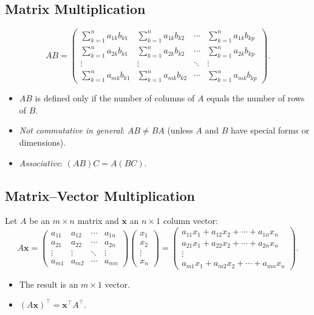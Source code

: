 \subsection{Matrix Multiplication}
\[
A B =
\begin{pmatrix}
\sum_{k=1}^n a_{1k} b_{k1} & \sum_{k=1}^n a_{1k} b_{k2} & \cdots & \sum_{k=1}^n a_{1k} b_{kp} \\
\sum_{k=1}^n a_{2k} b_{k1} & \sum_{k=1}^n a_{2k} b_{k2} & \cdots & \sum_{k=1}^n a_{2k} b_{kp} \\
\vdots                   & \vdots                   & \ddots & \vdots                   \\
\sum_{k=1}^n a_{mk} b_{k1} & \sum_{k=1}^n a_{mk} b_{k2} & \cdots & \sum_{k=1}^n a_{mk} b_{kp}
\end{pmatrix}.
\]
\begin{itemize}
\item $AB$ is defined only if the number of columns of $A$ equals the number of rows of $B$.
\item \emph{Not commutative in general}: $AB \neq BA$ (unless $A$ and $B$ have special forms or dimensions).
\item \emph{Associative}: $(AB)C = A(BC)$.
\end{itemize}

\subsection{Matrix--Vector Multiplication}
Let $A$ be an $m \times n$ matrix and $\mathbf{x}$ an $n \times 1$ column vector:
\[
A \mathbf{x} =
\begin{pmatrix}
a_{11} & a_{12} & \cdots & a_{1n} \\
a_{21} & a_{22} & \cdots & a_{2n} \\
\vdots & \vdots & \ddots & \vdots \\
a_{m1} & a_{m2} & \cdots & a_{mn}
\end{pmatrix}
\begin{pmatrix}
x_1 \\
x_2 \\
\vdots \\
x_n
\end{pmatrix}
=
\begin{pmatrix}
a_{11} x_1 + a_{12} x_2 + \cdots + a_{1n} x_n \\
a_{21} x_1 + a_{22} x_2 + \cdots + a_{2n} x_n \\
\vdots \\
a_{m1} x_1 + a_{m2} x_2 + \cdots + a_{mn} x_n
\end{pmatrix}.
\]
\begin{itemize}
\item The result is an $m \times 1$ vector.
\item $(A\mathbf{x})^\top = \mathbf{x}^\top A^\top$.
\end{itemize}

